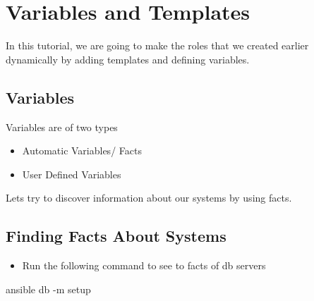 \chapter{Variables and Templates}

In this  tutorial, we  are going to make the roles that we created earlier dynamically by adding templates and defining variables.

\section{Variables}

Variables are of two types

\begin{itemize}
\item Automatic Variables/ Facts
\item User Defined Variables
\end{itemize}

Lets try to discover information about our systems by using facts.

\section{Finding Facts About Systems}

\begin{itemize}
\item Run the following command to see to facts of db servers
\end{itemize}

\begin{code}
ansible db -m setup
\end{code}

